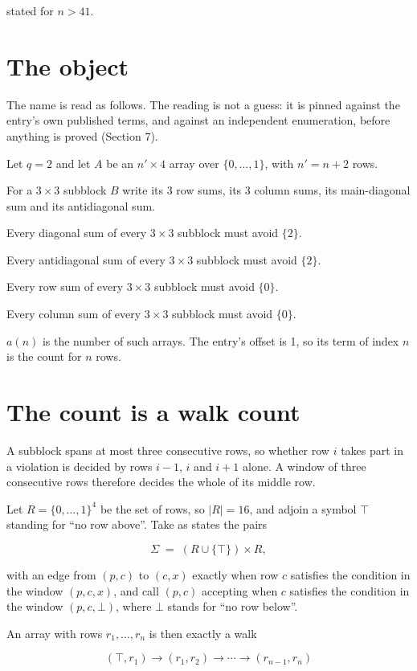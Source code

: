 \documentclass[11pt]{article}
\theoremstyle{definition}
\begin{document}
stated for $n > 41$.

\section{The object}

The name is read as follows. The reading is not a guess: it is pinned against the entry's own published terms, and against an independent enumeration, before anything is proved (Section 7).

Let $q = 2$ and let $A$ be an $n' \times 4$ array over $\{0,\dots,1\}$, with $n' = n + 2$ rows.

For a $3\times3$ subblock $B$ write its 3 row sums, its 3 column sums, its main-diagonal sum and its antidiagonal sum.

Every diagonal sum of every $3\times3$ subblock must avoid $\{2\}$.

Every antidiagonal sum of every $3\times3$ subblock must avoid $\{2\}$.

Every row sum of every $3\times3$ subblock must avoid $\{0\}$.

Every column sum of every $3\times3$ subblock must avoid $\{0\}$.

$a(n)$ is the number of such arrays. The entry's offset is 1, so its term of index $n$ is the count for $n$ rows.

\section{The count is a walk count}

A subblock spans at most three consecutive rows, so whether row $i$ takes part in a violation is decided by rows $i-1$, $i$ and $i+1$ alone. A window of three consecutive rows therefore decides the whole of its middle row.

Let $R = \{0,\dots,1\}^{4}$ be the set of rows, so $|R| = 16$, and adjoin a symbol $\top$ standing for ``no row above''. Take as states the pairs

\[\Sigma \;=\; (R \cup \{\top\}) \times R,\]

with an edge from $(p,c)$ to $(c,x)$ exactly when row $c$ satisfies the condition in the window $(p,c,x)$, and call $(p,c)$ accepting when $c$ satisfies the condition in the window $(p,c,\bot)$, where $\bot$ stands for ``no row below''.

An array with rows $r_1,\dots,r_n$ is then exactly a walk

\[(\top,r_1) \to (r_1,r_2) \to \cdots \to (r_{n-1},r_n)\]
\end{document}
